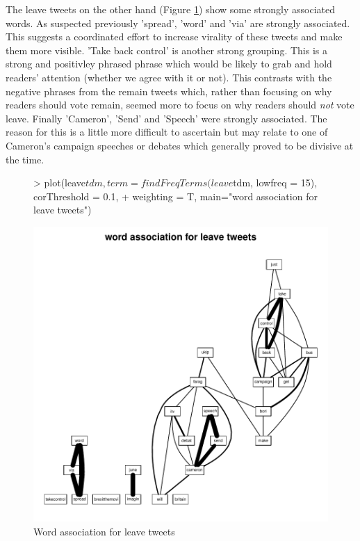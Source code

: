 \documentclass[10pt]{article}
\begin{document}
The leave tweets on the other hand (Figure \ref{fig13}) show some strongly associated words. As suspected previously 'spread', 'word' and 'via' are strongly associated. This suggests a coordinated effort to increase virality of these tweets and make them more visible. 
'Take back control' is another strong grouping. This is a strong and positivley phrased phrase  which would be likely to grab and hold readers' attention (whether we agree with it or not). This contrasts with the negative phrases from the remain tweets which, rather than focusing on why readers should vote remain, seemed more to focus on why readers should \emph{not} vote leave.
Finally 'Cameron', 'Send' and 'Speech' were strongly associated. The reason for this is a little more difficult to ascertain but may relate to one of Cameron's campaign speeches or debates which generally proved to be divisive at the time.
\begin{figure}[H]
\begin{center}
\begin{Schunk}
\begin{Sinput}
> plot(leave$tdm, term = findFreqTerms(leave$tdm, lowfreq = 15), corThreshold = 0.1,
+      weighting = T, main="word association for leave tweets")
\end{Sinput}
\end{Schunk}
\includegraphics{submission-034}
\caption {Word association for leave tweets}
\label{fig13}
\end {center}
\end {figure}
\end{document}
